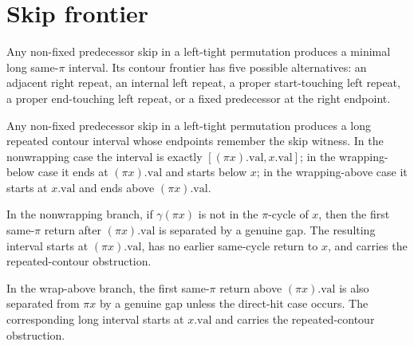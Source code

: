 \section{Skip frontier}

\begin{theorem}
  \label{thm:skip-minimal-frontier}
  \leanok
  Any non-fixed predecessor skip in a left-tight permutation produces a
  minimal long same-\(\pi\) interval.  Its contour frontier has five possible
  alternatives: an adjacent right repeat, an internal left repeat, a proper
  start-touching left repeat, a proper end-touching left repeat, or a fixed
  predecessor at the right endpoint.
\end{theorem}

\begin{theorem}
  \label{thm:skip-tied-contour}
  \leanok
  Any non-fixed predecessor skip in a left-tight permutation produces a long
  repeated contour interval whose endpoints remember the skip witness.  In the
  nonwrapping case the interval is exactly
  \([(\pi x).\mathrm{val},x.\mathrm{val}]\); in the wrapping-below case it
  ends at \((\pi x).\mathrm{val}\) and starts below \(x\); in the
  wrapping-above case it starts at \(x.\mathrm{val}\) and ends above
  \((\pi x).\mathrm{val}\).
\end{theorem}

\begin{theorem}
  \label{thm:skip-nonwrap-first-return}
  \leanok
  In the nonwrapping branch, if \(\gamma(\pi x)\) is not in the
  \(\pi\)-cycle of \(x\), then the first same-\(\pi\) return after
  \((\pi x).\mathrm{val}\) is separated by a genuine gap.  The resulting
  interval starts at \((\pi x).\mathrm{val}\), has no earlier same-cycle
  return to \(x\), and carries the repeated-contour obstruction.
\end{theorem}

\begin{theorem}
  \label{thm:skip-wrap-above-first-return}
  \leanok
  In the wrap-above branch, the first same-\(\pi\) return above
  \((\pi x).\mathrm{val}\) is also separated from \(\pi x\) by a genuine gap
  unless the direct-hit case occurs.  The corresponding long interval starts
  at \(x.\mathrm{val}\) and carries the repeated-contour obstruction.
\end{theorem}

